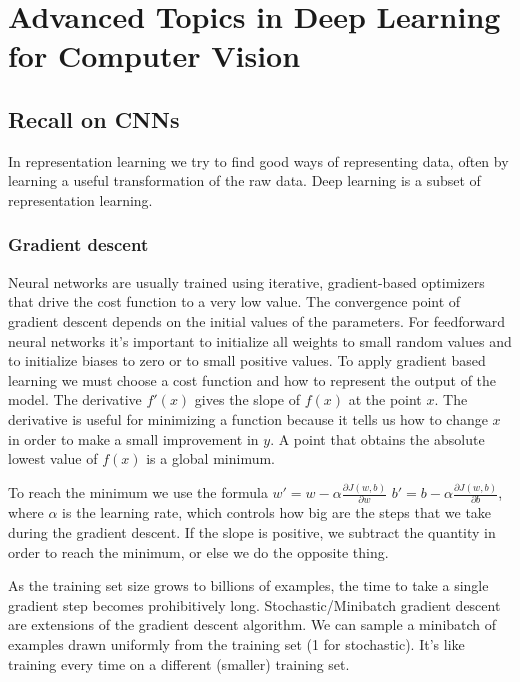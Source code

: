 \section{Advanced Topics in Deep Learning for Computer Vision}

\subsection{Recall on CNNs}

In representation learning we try to find good ways of representing data, often by learning a useful transformation of the raw data.
Deep learning is a subset of representation learning.

\subsubsection{Gradient descent}
Neural networks are usually trained using iterative, gradient-based optimizers that drive the cost function to a very low value.
The convergence point of gradient descent depends on the initial values of the parameters.
For feedforward neural networks it's important to initialize all weights to small random values and to initialize biases to zero or to small positive values.
To apply gradient based learning we must choose a cost function and how to represent the output of the model.
The derivative $f'(x)$ gives the slope of $f(x)$ at the point $x$.
The derivative is useful for minimizing a function because it tells us how to change $x$ in order to make a small improvement in $y$.
A point that obtains the absolute lowest value of $f(x)$ is a global minimum.

To reach the minimum we use the formula $w' = w - \alpha \frac{\partial J(w,b)}{\partial w} \,\, b' = b - \alpha \frac{\partial J(w,b)}{\partial b}$, where $\alpha$ is the learning rate, which controls how big are the steps that we take during the gradient descent.
If the slope is positive, we subtract the quantity in order to reach the minimum, or else we do the opposite thing.

As the training set size grows to billions of examples, the time to take a single gradient step becomes prohibitively long.
Stochastic/Minibatch gradient descent are extensions of the gradient descent algorithm. We can sample a minibatch of examples drawn uniformly from the training set (1 for stochastic).
It's like training every time on a different (smaller) training set.

